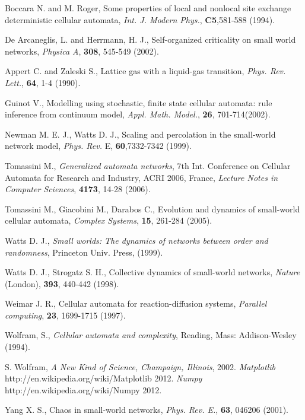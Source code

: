 \documentclass[11pt,twocolumn]{article}
\begin{document}
\begin{thebibliography}{A}

 Boccara N. and M. Roger,
    Some properties of local and nonlocal site exchange deterministic
    cellular automata, {\it Int. J. Modern Phys.}, {\bf C5},581-588 (1994).

 De Arcaneglis, L. and Herrmann, H. J.,
Self-organized criticality on small world networks, {\it Physica
A}, {\bf 308}, 545-549 (2002).

 Appert C. and Zaleski S., Lattice gas with a
liquid-gas transition, {\it Phys. Rev. Lett.}, {\bf 64}, 1-4
(1990).

 Guinot V., Modelling using stochastic, finite state
cellular automata: rule inference from continuum model, {\it Appl.
Math. Model.}, {\bf 26}, 701-714(2002).

 Newman M. E. J., Watts D. J., Scaling and percolation
in the small-world network model, {\it Phys. Rev.} E, {\bf
60},7332-7342 (1999).


 Tomassini M., {\it Generalized automata networks},
7th Int. Conference on Cellular Automata for Research and Industry,
ACRI 2006, France, {\it Lecture Notes in Computer Sciences}, {\bf
4173}, 14-28 (2006).

 Tomassini M., Giacobini M., Darabos C.,
Evolution and dynamics of small-world cellular automata, {\it
Complex Systems}, {\bf 15}, 261-284 (2005).

 Watts D. J., {\it Small worlds: The dynamics of networks
between order and randomness}, Princeton Univ. Press, (1999).

 Watts D. J., Strogatz S. H., Collective dynamics of small-world
networks, {\it Nature} (London), {\bf 393}, 440-442 (1998).

 Weimar J. R., Cellular automata for reaction-diffusion systems,
{\it Parallel computing}, {\bf 23}, 1699-1715 (1997).

 Wolfram, S., {\it Cellular automata and complexity},
Reading, Mass: Addison-Wesley (1994).

 S. Wolfram, {\it A New Kind of Science, Champaign, Illinois}, 2002.
 {\it Matplotlib} http://en.wikipedia.org/wiki/Matplotlib 2012.  
 {\it Numpy} http://en.wikipedia.org/wiki/Numpy 2012.

 Yang X. S., Chaos in small-world networks, {\it
Phys. Rev. E.}, {\bf 63}, 046206 (2001).


\end{thebibliography}
\end{document}
